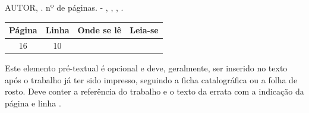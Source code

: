 \begin{errata}

\noindent AUTOR, \textbf{\imprimirtitulo} \imprimirsubtitulo. nº de páginas. \imprimirtipotrabalho - 
\imprimirdepartamento, \imprimirinstituicao, \imprimirlocal, \imprimirano.

\begin{table}[!ht]
\centering
\begin{tabular}{|c|c|c|c|} \hline
\textbf{Página} & \textbf{Linha} & \textbf{Onde se lê} & \textbf{Leia-se} \\ \hline
16 & 10 & &  \\ \hline
\end{tabular}
\end{table}


Este elemento pré-textual é opcional e deve, geralmente, ser inserido no texto após o trabalho já ter sido impresso, seguindo a ficha catalográfica ou a folha de rosto. Deve conter a referência do trabalho e o texto da errata com a indicação da página e linha \cite{NBR14724:2011}.

\end{errata}